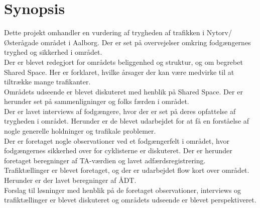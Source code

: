 \section{Synopsis}
\label{sec:synopsis}





{\tiny Dette projekt omhandler en vurdering af trygheden af trafikken i Nytorv/Østerågade området i Aalborg. Der er set på overvejelser omkring fodgængernes tryghed og sikkerhed i området.
\\
Der er blevet redegjort for områdets beliggenhed og struktur, og om begrebet Shared Space. Her er forklaret, hvilke årsager der kan være medvirke til at tiltrække mange trafikanter.
\\
Områdets udseende er blevet diskuteret med henblik på Shared Space. Der er herunder set på sammenligninger og folks færden i området.
\\
Der er lavet interviews af fodgængere, hvor der er set på deres opfattelse af trygheden i området. Herunder er de blevet udarbejdet for at få en forståelse af nogle generelle holdninger og trafikale problemer.
\\
Der er foretaget nogle observationer ved et fodgængerfelt i området, hvor fodgængernes sikkerhed over for cyklisterne er diskuteret. Der er herunder foretaget beregninger af TA-værdien og lavet adfærdsregistrering.
\\
Trafiktællinger er blevet foretaget, og der er udarbejdet flow kort over området. Herunder er der lavet beregninger af ÅDT.
\\
Forslag til løsninger med henblik på de foretaget observationer, interviews og trafiktællinger er blevet diskuteret og områdets udseende er blevet perspektiveret.}
